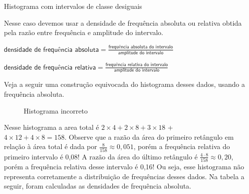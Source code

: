 {{\begin{example}{Histograma com intervalos de classe desiguais}
\par


Nesse caso devemos usar a densidade de frequência absoluta ou relativa obtida pela razão entre frequência e amplitude do intervalo.

\(\textsf{densidade de frequência absoluta}=\frac{\textsf{frequência absoluta do intervalo}}{\textsf{amplitude do intervalo}}\)

\(\textsf{densidade de frequência relativa}=\frac{\textsf{frequência relativa do intervalo}}{\textsf{amplitude do intervalo}}\)

Veja a seguir uma construção equivocada do histograma desses dados, usando a frequência absoluta.

\begin{figure}[H]
\centering
\capstart

\noindent
{}
\caption{Histograma incorreto}\label{\detokenize{PE103-4:fig-coloque-aqui-o-nome}}
\label{est1-fig-18}
\end{figure}

Nesse histograma a area total é $2 \times 4 + 2 \times 8 + 3\times 18$ +\\ $  4 \times 12 + 4 \times 8 = 158$. Observe que a razão da área do primeiro retângulo em relação à área total é dada por \(\displaystyle{\frac{8}{158}}\approx  0,051\), porém a frequência relativa do primeiro intervalo é 0,08! A razão da área do último retângulo é \(\displaystyle{\frac{4\cdot 8}{158}}\approx 0,20\), porém a frequência relativa desse intervalo é 0,16! Ou seja, esse histograma não representa corretamente a distribuição de frequências desses dados. Na tabela a seguir, foram calculadas as densidades de frequência absoluta.




\end{example}}}
